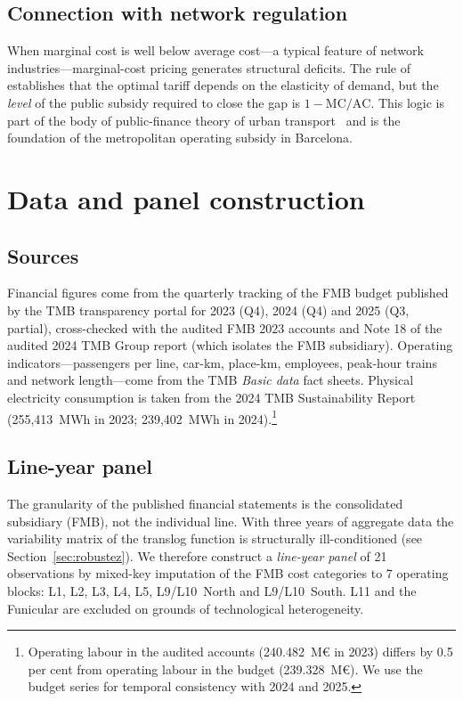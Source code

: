 \documentclass[11pt,a4paper]{article}
\begin{document}
\subsection{Connection with network regulation}
When marginal cost is well below average cost---a typical feature of
network industries---marginal-cost pricing generates structural deficits.
The rule of \citet{boiteux1956} establishes that the optimal tariff depends
on the elasticity of demand, but the \emph{level} of the public subsidy
required to close the gap is $1 - \text{MC}/\text{AC}$. This logic is part
of the body of public-finance theory of urban
transport~\citep{small2007,pigou1920,allais1947} and is the foundation of
the metropolitan operating subsidy in Barcelona.

\section{Data and panel construction}
\label{sec:datos}

\subsection{Sources}
Financial figures come from the quarterly tracking of the FMB budget
published by the TMB transparency portal for 2023 (Q4), 2024 (Q4) and
2025 (Q3, partial), cross-checked with the audited FMB 2023 accounts and
Note 18 of the audited 2024 TMB Group report (which isolates the FMB
subsidiary). Operating indicators---passengers per line, car-km, place-km,
employees, peak-hour trains and network length---come from the TMB
\emph{Basic data} fact sheets. Physical electricity consumption is taken
from the 2024 TMB Sustainability Report (255{,}413~MWh in 2023; 239{,}402~MWh
in 2024).\footnote{Operating labour in the audited accounts
(240.482~M\euro{} in 2023) differs by 0.5 per cent from operating labour
in the budget (239.328~M\euro{}). We use the budget series for temporal
consistency with 2024 and 2025.}

\subsection{Line-year panel}
The granularity of the published financial statements is the consolidated
subsidiary (FMB), not the individual line. With three years of aggregate
data the variability matrix of the translog function is structurally
ill-conditioned (see Section~\ref{sec:robustez}). We therefore construct
a \emph{line-year panel} of 21 observations by mixed-key imputation of
the FMB cost categories to 7 operating blocks: L1, L2, L3, L4, L5,
L9/L10~North and L9/L10~South. L11 and the Funicular are excluded on
grounds of technological heterogeneity.
\end{document}
